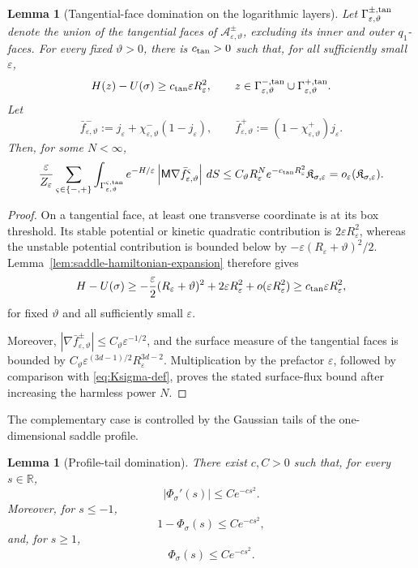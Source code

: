 \documentclass[11pt]{article}
\numberwithin{equation}{section}
\theoremstyle{plain}
\newtheorem{lemma}[theorem]{Lemma}
\theoremstyle{definition}
\theoremstyle{remark}
\newcommand{\R}{\mathbb R}
\newcommand{\eps}{\varepsilon}
\begin{document}
\begin{lemma}[Tangential-face domination on the logarithmic layers]
\label{lem:stable-side-gaussian-domination}
Let $\Gamma_{\eps,\vartheta}^{\pm,\rm tan}$ denote the union of the tangential
faces of $\mathcal A_{\eps,\vartheta}^\pm$, excluding its inner and outer
$q_1$-faces.  For every fixed $\vartheta>0$, there is $c_{\rm tan}>0$ such that,
for all sufficiently small $\eps$,
\[
H(z)-U(\sigma)\ge c_{\rm tan}\eps R_\eps^2,
\qquad z\in
\Gamma_{\eps,\vartheta}^{-,\rm tan}\cup
\Gamma_{\eps,\vartheta}^{+,\rm tan}.
\]
Let
\[
\bar f_{\eps,\vartheta}^-
:=j_\eps+\chi_{\eps,\vartheta}^-(1-j_\eps),
\qquad
\bar f_{\eps,\vartheta}^+
:=(1-\chi_{\eps,\vartheta}^+)j_\eps.
\]
Then, for some $N<\infty$,
\[
\frac{\eps}{Z_\eps}
\sum_{\varsigma\in\{-,+\}}
\int_{\Gamma_{\eps,\vartheta}^{\varsigma,\rm tan}}
e^{-H/\eps}
\left|\mathsf M\nabla\bar f_{\eps,\vartheta}^\varsigma\right|\,dS
\le C_\vartheta R_\eps^N e^{-c_{\rm tan}R_\eps^2}
\mathfrak K_{\sigma,\eps}
=o_\eps(\mathfrak K_{\sigma,\eps}).
\]
\end{lemma}

\begin{proof}
On a tangential face, at least one transverse coordinate is at its box
threshold.  Its stable potential or kinetic quadratic contribution is
$2\eps R_\eps^2$, whereas the unstable potential contribution is bounded
below by
$-\eps(R_\eps+\vartheta)^2/2$.  Lemma~\ref{lem:saddle-hamiltonian-expansion}
therefore gives
\[
H-U(\sigma)
\ge
-\frac\eps2(R_\eps+\vartheta)^2
+2\eps R_\eps^2
+o(\eps R_\eps^2)
\ge c_{\rm tan}\eps R_\eps^2,
\]
for fixed $\vartheta$ and all sufficiently small $\eps$.

Moreover,
$|\nabla\bar f_{\eps,\vartheta}^\pm|\le C_\vartheta\eps^{-1/2}$,
and the surface measure of the tangential faces is bounded by
$C_\vartheta\eps^{(3d-1)/2}R_\eps^{3d-2}$.  Multiplication by the prefactor
$\eps$, followed by comparison with \eqref{eq:Ksigma-def}, proves the stated
surface-flux bound after increasing the harmless power $N$.
\end{proof}

The complementary case is controlled by the Gaussian tails of
the one-dimensional saddle profile.

\begin{lemma}[Profile-tail domination]
\label{lem:profile-tail-domination}
There exist $c,C>0$ such that, for every $s\in\R$,
\[
|\Phi_\sigma'(s)|\le Ce^{-cs^2}.
\]
Moreover, for $s\le-1$,
\[
1-\Phi_\sigma(s)\le Ce^{-cs^2},
\]
and, for $s\ge1$,
\[
\Phi_\sigma(s)\le Ce^{-cs^2}.
\]
\end{lemma}
\end{document}
